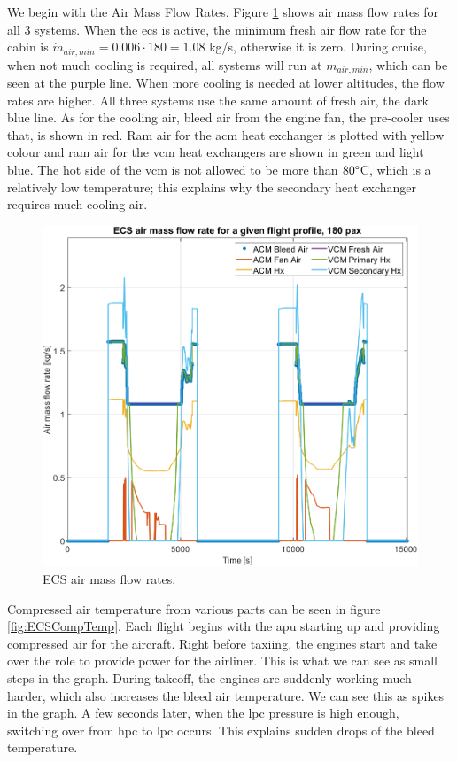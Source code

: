 \documentclass[english]{kththesis}
\begin{document}
We begin with the Air Mass Flow Rates. Figure \ref{fig:ECSMassFlow} shows air mass flow rates for all 3 systems. When the \acrshort{ecs} is active, the minimum fresh air flow rate for the cabin is $\dot{m}_{air,min}=0.006\cdot 180 = 1.08$ kg/s, otherwise it is zero. During cruise, when not much cooling is required, all systems will run at $\dot{m}_{air,min}$, which can be seen at the purple line. When more cooling is needed at lower altitudes, the flow rates are higher. All three systems use the same amount of fresh air, the dark blue line. As for the cooling air, bleed air from the engine fan, the pre-cooler uses that, is shown in red. Ram air for the \acrshort{acm} heat exchanger is plotted with yellow colour and ram air for the \acrshort{vcm} heat exchangers are shown in green and light blue. The hot side of the \acrshort{vcm} is not allowed to be more than $80\degree$C, which is a relatively low temperature; this explains why the secondary heat exchanger requires much cooling air.

 

\begin{figure}[!ht]
    \centering
    \includegraphics[width=1\textwidth]{Epictures/ECSMassFlow180pax.png}
    \caption{ECS air mass flow rates.}
    \label{fig:ECSMassFlow}
\end{figure}

\clearpage

Compressed air temperature from various parts can be seen in figure \ref{fig:ECSCompTemp}. Each flight begins with the \acrshort{apu} starting up and providing compressed air for the aircraft. Right before taxiing, the engines start and take over the role to provide power for the airliner. This is what we can see as small steps in the graph. During takeoff, the engines are suddenly working much harder, which also increases the bleed air temperature. We can see this as spikes in the graph. A few seconds later, when the \acrshort{lpc} pressure is high enough, switching over from \acrshort{hpc} to \acrshort{lpc} occurs. This explains sudden drops of the bleed temperature.
\end{document}
